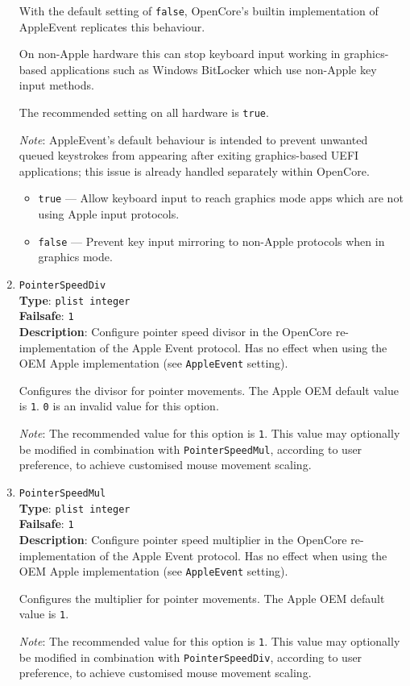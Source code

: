 \documentclass[]{article}
\providecommand{\tightlist}{%
  \setlength{\itemsep}{0pt}\setlength{\parskip}{0pt}}
\begin{document}
\begin{enumerate}
  With the default setting of \texttt{false}, OpenCore's builtin implementation of AppleEvent replicates this behaviour.

  On non-Apple hardware this can stop keyboard input working in graphics-based applications such as Windows BitLocker
  which use non-Apple key input methods.

  The recommended setting on all hardware is \texttt{true}.

  \emph{Note}: AppleEvent's default behaviour is intended to prevent unwanted queued keystrokes from appearing
  after exiting graphics-based UEFI applications; this issue is already handled separately within OpenCore.

  \begin{itemize}
  \tightlist
  \item \texttt{true} --- Allow keyboard input to reach graphics mode apps which are not using Apple input protocols.
  \item \texttt{false} --- Prevent key input mirroring to non-Apple protocols when in graphics mode.
  \end{itemize}

  \item
  \texttt{PointerSpeedDiv}\\
  \textbf{Type}: \texttt{plist\ integer}\\
  \textbf{Failsafe}: \texttt{1}\\
  \textbf{Description}: Configure pointer speed divisor in the OpenCore re-implementation
  of the Apple Event protocol.
  Has no effect when using the OEM Apple implementation (see \texttt{AppleEvent} setting).

  Configures the divisor for pointer movements. The Apple OEM default value is \texttt{1}.
  \texttt{0} is an invalid value for this option.

  \emph{Note}: The recommended value for this option is \texttt{1}. This value may
  optionally be modified in combination with \texttt{PointerSpeedMul}, according to user
  preference, to achieve customised mouse movement scaling.

\item
  \texttt{PointerSpeedMul}\\
  \textbf{Type}: \texttt{plist\ integer}\\
  \textbf{Failsafe}: \texttt{1}\\
  \textbf{Description}: Configure pointer speed multiplier in the OpenCore re-implementation
  of the Apple Event protocol.
  Has no effect when using the OEM Apple implementation (see \texttt{AppleEvent} setting).

  Configures the multiplier for pointer movements. The Apple OEM default value is \texttt{1}.

  \emph{Note}: The recommended value for this option is \texttt{1}. This value may
  optionally be modified in combination with \texttt{PointerSpeedDiv}, according to user
  preference, to achieve customised mouse movement scaling.

\end{enumerate}
\end{document}
